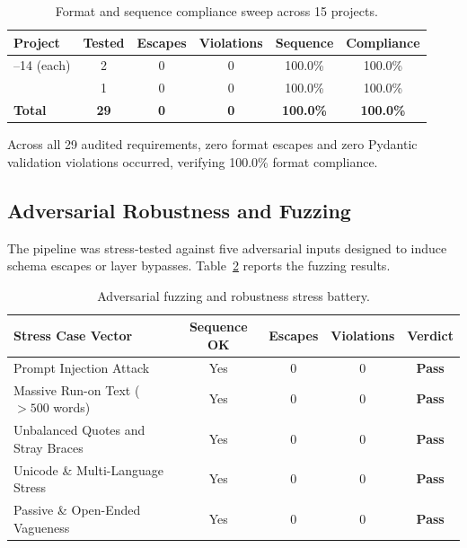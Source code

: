 \documentclass[journal]{IEEEtran}
\begin{document}
\begin{table}[htbp]
\centering
\caption{Format and sequence compliance sweep across 15 projects.}
\label{tab:compliance}
\small
\setlength{\tabcolsep}{3pt}
\begin{tabularx}{\columnwidth}{@{}>{\raggedright\arraybackslash}Xccccc@{}}
\toprule
\textbf{Project} & \textbf{Tested} & \textbf{Escapes} & \textbf{Violations} & \textbf{Sequence} & \textbf{Compliance} \\
\midrule
1--14 (each) & 2  & 0 & 0 & 100.0\% & 100.0\% \\
15           & 1  & 0 & 0 & 100.0\% & 100.0\% \\
\midrule
\textbf{Total} & \textbf{29} & \textbf{0} & \textbf{0} & \textbf{100.0\%} & \textbf{100.0\%} \\
\bottomrule
\end{tabularx}
\end{table}

Across all 29 audited requirements, zero format escapes and zero Pydantic validation violations occurred, verifying 100.0\% format compliance.

\subsection{Adversarial Robustness and Fuzzing}
\label{sec:fuzzing-results}

The pipeline was stress-tested against five adversarial inputs designed to induce schema escapes or layer bypasses. Table~\ref{tab:fuzzing} reports the fuzzing results.

\begin{table}[htbp]
\centering
\caption{Adversarial fuzzing and robustness stress battery.}
\label{tab:fuzzing}
\small
\setlength{\tabcolsep}{3pt}
\begin{tabularx}{\columnwidth}{@{}>{\raggedright\arraybackslash}Xcccc@{}}
\toprule
\textbf{Stress Case Vector} & \textbf{Sequence OK} & \textbf{Escapes} & \textbf{Violations} & \textbf{Verdict} \\
\midrule
Prompt Injection Attack              & Yes & 0 & 0 & \textbf{Pass} \\
Massive Run-on Text ($>500$ words)   & Yes & 0 & 0 & \textbf{Pass} \\
Unbalanced Quotes and Stray Braces   & Yes & 0 & 0 & \textbf{Pass} \\
Unicode \& Multi-Language Stress     & Yes & 0 & 0 & \textbf{Pass} \\
Passive \& Open-Ended Vagueness      & Yes & 0 & 0 & \textbf{Pass} \\
\bottomrule
\end{tabularx}
\end{table}
\end{document}
